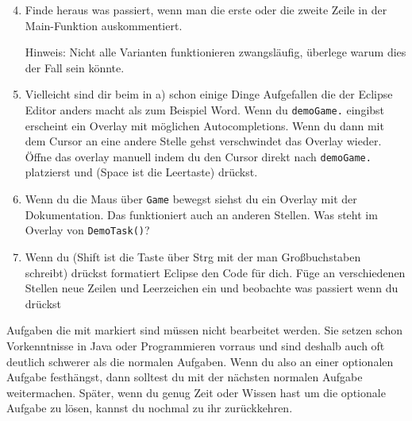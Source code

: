 \begin{enumerate} \setcounter{enumi}{3}
    \item Finde heraus was passiert, wenn man die erste oder die zweite Zeile in der Main-Funktion auskommentiert.
    
        Hinweis: Nicht alle Varianten funktionieren zwangsläufig, überlege warum dies der Fall sein könnte.
    \item Vielleicht sind dir beim in a) schon einige Dinge Aufgefallen die der Eclipse Editor anders macht als zum Beispiel Word.
        Wenn du \lstinline{demoGame.} eingibst erscheint ein Overlay mit möglichen Autocompletions.
        Wenn du dann mit dem Cursor an eine andere Stelle gehst verschwindet das Overlay wieder.
        Öffne das overlay manuell indem du den Cursor direkt nach \lstinline{demoGame.} platzierst und  (Space ist die Leertaste) drückst.
    \item
        Wenn du die Maus über \lstinline{Game} bewegst siehst du ein Overlay mit der Dokumentation.
        Das funktioniert auch an anderen Stellen.
        Was steht im Overlay von \lstinline{DemoTask()}?
    \item
        Wenn du  (Shift ist die Taste über Strg mit der man Großbuchstaben schreibt) drückst formatiert Eclipse den Code für dich.
        Füge an verschiedenen Stellen neue Zeilen und Leerzeichen ein und beobachte was passiert wenn du  drückst
\end{enumerate}


\begin{Infobox} 
    Aufgaben die mit \optional markiert sind müssen nicht bearbeitet werden.
    Sie setzen schon Vorkenntnisse in Java oder Programmieren vorraus und sind deshalb auch oft deutlich schwerer als die normalen Aufgaben.
    Wenn du also an einer optionalen Aufgabe festhängst, dann solltest du mit der nächsten normalen Aufgabe weitermachen.
    Später, wenn du genug Zeit oder Wissen hast um die optionale Aufgabe zu lösen, kannst du nochmal zu ihr zurückkehren.
\end{Infobox}


